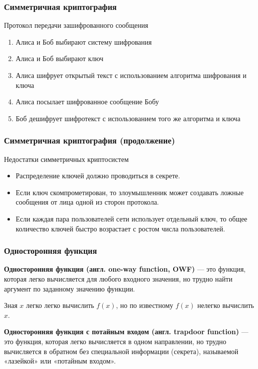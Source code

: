 \documentclass{beamer}
\newcommand{\define}[2]{{\bf #1} --- #2.\vspace{1em}}
\begin{document}
\begin{frame}
  \frametitle{Симметричная криптография}

  \begin{block}{Протокол передачи зашифрованного сообщения}
  \begin{enumerate}
    \item{Алиса и Боб выбирают систему шифрования}
    \item{Алиса и Боб выбирают ключ}
    \item{Алиса шифрует открытый текст с использованием алгоритма шифрования и ключа}
    \item{Алиса посылает шифрованное сообщение Бобу}
    \item{Боб дешифрует шифротекст с использованием того же алгоритма и ключа}
  \end{enumerate}
  \end{block}
\end{frame}


\begin{frame}
  \frametitle{Симметричная криптография (продолжение)}

  \begin{block} {Недостатки симметричных криптосистем}
  \begin{itemize}
    \item{Распределение ключей должно проводиться в секрете.}
    \item{Если ключ скомпрометирован, то злоумышленник может создавать ложные сообщения от лица одной из сторон протокола.}
    \item{Если каждая пара пользователей сети использует отдельный ключ, то общее количество ключей быстро 
          возрастает с ростом числа пользователей.}
  \end{itemize}
  \end{block}
\end{frame}

\begin{frame}
  \frametitle{Односторонняя функция}
  \define{Односторонняя функция (англ. one-way function, OWF)} {это функция, которая легко вычисляется для
         любого входного значения, но трудно найти аргумент по заданному значению функции}

  Зная $x$ легко легко вычислить $f(x)$, но по известному $f(x)$ нелегко вычислить $x$.

  \vspace{1\baselineskip}

  \define{Односторонняя функция с потайным входом (англ. trapdoor function)} {это функция, которая легко вычисляется
  в одном направлении, но трудно вычисляется в обратном без специальной информации (секрета), называемой «лазейкой» или «потайным входом»}
\end{frame}
\end{document}
